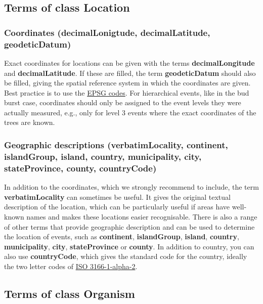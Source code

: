 \documentclass[
  oneside]{book}
\begin{document}
\subsection{Terms of class Location}\label{terms-of-class-location}

\subsubsection{Coordinates (decimalLonigtude, decimalLatitude, geodeticDatum)}\label{coordinates-decimallonigtude-decimallatitude-geodeticdatum}

Exact coordinates for locations can be given with the terms \textbf{decimalLongitude} and \textbf{decimalLatitude}. If these are filled, the term \textbf{geodeticDatum} should also be filled, giving the spatial reference system in which the coordinates are given. Best practice is to use the \href{https://epsg.io/?q=\%20kind\%3AGEOGCRS}{EPSG codes}. For hierarchical events, like in the bud burst case, coordinates should only be assigned to the event levels they were actually measured, e.g., only for level 3 events where the exact coordinates of the trees are known.

\subsubsection{Geographic descriptions (verbatimLocality, continent, islandGroup, island, country, municipality, city, stateProvince, county, countryCode)}\label{geographic-descriptions-verbatimlocality-continent-islandgroup-island-country-municipality-city-stateprovince-county-countrycode}

In addition to the coordinates, which we strongly recommend to include, the term \textbf{verbatimLocality} can sometimes be useful. It gives the original textual description of the location, which can be particularly useful if areas have well-known names and makes these locations easier recognisable. There is also a range of other terms that provide geographic description and can be used to determine the location of events, such as \textbf{continent}, \textbf{islandGroup}, \textbf{island}, \textbf{country}, \textbf{municipality}, \textbf{city}, \textbf{stateProvince} or \textbf{county}. In addition to country, you can also use \textbf{countryCode}, which gives the standard code for the country, ideally the two letter codes of \href{https://www.iban.com/country-codes}{ISO 3166-1-alpha-2}.

\subsection{Terms of class Organism}\label{terms-of-class-organism}
\end{document}
